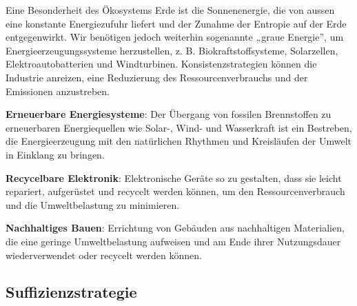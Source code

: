 \documentclass[
  nswissgerman,
  a4paper,
  openany]{book}
\begin{document}
Eine Besonderheit des Ökosystems Erde ist die Sonnenenergie, die von
aussen eine konstante Energiezufuhr liefert und der Zunahme der Entropie
auf der Erde entgegenwirkt. Wir benötigen jedoch weiterhin sogenannte
„graue Energie'', um Energieerzeugungssysteme herzustellen, z. B.
Biokraftstoffsysteme, Solarzellen, Elektroautobatterien und
Windturbinen. Konsistenzstrategien können die Industrie anreizen, eine
Reduzierung des Ressourcenverbrauchs und der Emissionen anzustreben.

\begin{tcolorbox}[enhanced jigsaw, arc=.35mm, bottomrule=.15mm, bottomtitle=1mm, breakable, colback=white, colbacktitle=quarto-callout-tip-color!10!white, colframe=quarto-callout-tip-color-frame, coltitle=black, left=2mm, leftrule=.75mm, opacityback=0, opacitybacktitle=0.6, rightrule=.15mm, title={Konsistenzstrategien in der Praxis: Beispiele}, titlerule=0mm, toprule=.15mm, toptitle=1mm]

\textbf{Erneuerbare Energiesysteme}: Der Übergang von fossilen
Brennstoffen zu erneuerbaren Energiequellen wie Solar-, Wind- und
Wasserkraft ist ein Bestreben, die Energieerzeugung mit den natürlichen
Rhythmen und Kreisläufen der Umwelt in Einklang zu bringen.

\textbf{Recycelbare Elektronik}: Elektronische Geräte so zu gestalten,
dass sie leicht repariert, aufgerüstet und recycelt werden können, um
den Ressourcenverbrauch und die Umweltbelastung zu minimieren.

\textbf{Nachhaltiges Bauen}: Errichtung von Gebäuden aus nachhaltigen
Materialien, die eine geringe Umweltbelastung aufweisen und am Ende
ihrer Nutzungsdauer wiederverwendet oder recycelt werden können.

\end{tcolorbox}

\subsection{Suffizienzstrategie}\label{suffizienzstrategie}
\end{document}

